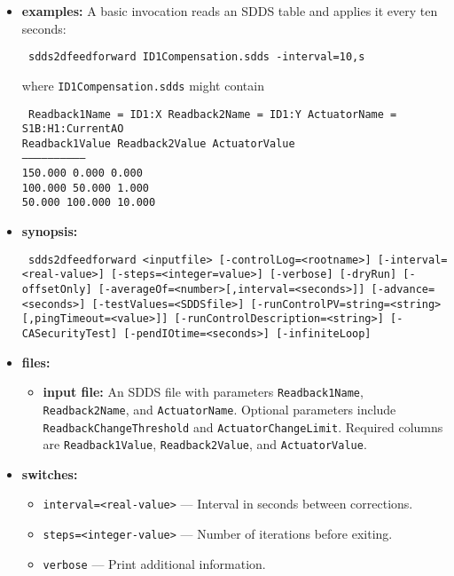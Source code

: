 \begin{itemize}
\item {\bf examples:}
A basic invocation reads an SDDS table and applies it every ten seconds:
\begin{flushleft}{\tt
sdds2dfeedforward ID1Compensation.sdds -interval=10,s
}\end{flushleft}
where \verb+ID1Compensation.sdds+ might contain
\begin{flushleft}{\tt
Readback1Name = ID1:X \quad Readback2Name = ID1:Y \quad ActuatorName = S1B:H1:CurrentAO\\
 Readback1Value  Readback2Value  ActuatorValue\\
------------------------------\\
       150.000       0.000          0.000\\
       100.000      50.000          1.000\\
        50.000     100.000         10.000\\
}\end{flushleft}
\item {\bf synopsis:}
\begin{flushleft}{\tt
sdds2dfeedforward <inputfile>\
       [-controlLog=<rootname>]\
       [-interval=<real-value>] [-steps=<integer=value>]\
       [-verbose] [-dryRun] [-offsetOnly]\
       [-averageOf=<number>[,interval=<seconds>]]\
       [-advance=<seconds>]\
       [-testValues=<SDDSfile>]\
       [-runControlPV=string=<string>[,pingTimeout=<value>]]\
       [-runControlDescription=<string>]\
       [-CASecurityTest]\
       [-pendIOtime=<seconds>] [-infiniteLoop]
}\end{flushleft}
\item {\bf files:}
\begin{itemize}
  \item {\bf input file:} An SDDS file with parameters \verb+Readback1Name+,
  \verb+Readback2Name+, and \verb+ActuatorName+.  Optional parameters include
  \verb+ReadbackChangeThreshold+ and \verb+ActuatorChangeLimit+.  Required
  columns are \verb+Readback1Value+, \verb+Readback2Value+, and
  \verb+ActuatorValue+.
\end{itemize}
\item {\bf switches:}
    \begin{itemize}
        \item {\tt interval=<real-value>} --- Interval in seconds between corrections.
        \item {\tt steps=<integer-value>} --- Number of iterations before exiting.
        \item {\tt verbose} --- Print additional information.

\end{itemize}
\end{itemize}
